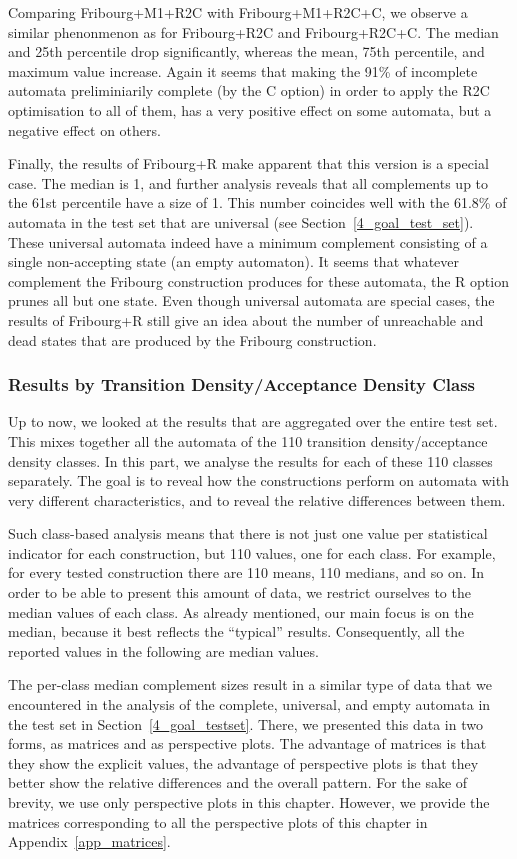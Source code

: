 Comparing Fribourg+M1+R2C with Fribourg+M1+R2C+C, we observe a similar phenonmenon as for Fribourg+R2C and Fribourg+R2C+C. The median and 25th percentile drop significantly, whereas the mean, 75th percentile, and maximum value increase. Again it seems that making the 91\% of incomplete automata preliminiarily complete (by the C option) in order to apply the R2C optimisation to all of them, has a very positive effect on some automata, but a negative effect on others.

Finally, the results of Fribourg+R make apparent that this version is a special case. The median is 1, and further analysis reveals that all complements up to the 61st percentile have a size of 1. This number coincides well with the 61.8\% of automata in the \goal{} test set that are universal (see Section~\ref{4_goal_test_set}). These universal automata indeed have a minimum complement consisting of a single non-accepting state (an empty automaton). It seems that whatever complement the Fribourg construction produces for these automata, the R option prunes all but one state. Even though universal automata are special cases, the results of Fribourg+R still give an idea about the number of unreachable and dead states that are produced by the Fribourg construction.

\subsubsection{Results by Transition Density/Acceptance Density Class}
Up to now, we looked at the results that are aggregated over the entire test set. This mixes together all the automata of the 110 transition density/acceptance density classes. In this part, we analyse the results for each of these 110 classes separately. The goal is to reveal how the constructions perform on automata with very different characteristics, and to reveal the relative differences between them.

Such class-based analysis means that there is not just one value per statistical indicator for each construction, but 110 values, one for each class. For example, for every tested construction there are 110 means, 110 medians, and so on. In order to be able to present this amount of data, we restrict ourselves to the median values of each class. As already mentioned, our main focus is on the median, because it best reflects the ``typical'' results. Consequently, all the reported values in the following are median values. 

The per-class median complement sizes result in a similar type of data that we encountered in the analysis of the complete, universal, and empty automata in the \goal{} test set in Section~\ref{4_goal_testset}. There, we presented this data in two forms, as matrices and as perspective plots. The advantage of matrices is that they show the explicit values, the advantage of perspective plots is that they better show the relative differences and the overall pattern. For the sake of brevity, we use only perspective plots in this chapter. However, we provide the matrices corresponding to all the perspective plots of this chapter in Appendix~\ref{app_matrices}.


